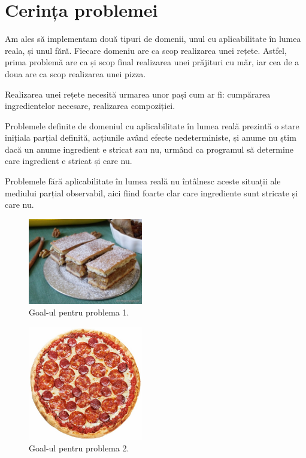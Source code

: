 \section{Cerința problemei}
Am ales să implementam două tipuri de domenii, unul cu aplicabilitate în lumea reala, și unul fără.
Fiecare domeniu are ca scop realizarea unei rețete. Astfel, prima problemă are ca și scop final realizarea unei prăjituri cu măr, iar cea de a doua are ca scop realizarea unei pizza.

Realizarea unei rețete necesită urmarea unor pași cum ar fi: cumpărarea ingredientelor necesare, realizarea compoziției.

 Problemele definite de domeniul cu aplicabilitate în lumea reală prezintă o stare inițiala parțial definită, acțiunile având efecte nedeterministe, și anume nu știm dacă un anume ingredient e stricat sau nu, urmând ca programul să determine care ingredient e stricat și care nu.
 
 \newline
 Problemele fără aplicabilitate în lumea reală nu întâlnesc aceste situații ale  mediului parțial observabil, aici fiind foarte clar care ingrediente sunt stricate și care nu.
 
 
\newline





\begin{center}
\begin{figure}[htb]
 \centering \includegraphics[width=50mm,scale=0.5]{prajitura.jpeg}
 \caption{Goal-ul pentru problema 1.}
  \label{fig:boat1}
  \end{figure}
\end {center}
\begin{figure}[htb]
 \centering \includegraphics[width=50mm,scale=0.5]{pizza.jpeg}
 \caption{Goal-ul pentru problema 2.}
  \label{fig:boat2}
  \end{figure}


\newpage